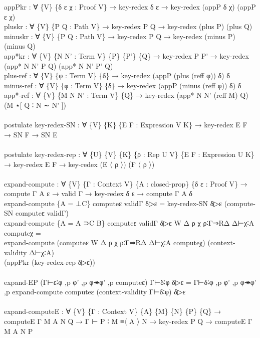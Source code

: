 {\begin{code}
{\>  appPkr : ∀ \{V\} \{δ ε χ : Proof V\} → key-redex δ ε → key-redex (appP δ χ) (appP ε χ)\<\\
\>  pluskr : ∀ \{V\} \{P Q : Path V\} → key-redex P Q → key-redex (plus P) (plus Q)\<\\
\>  minuskr : ∀ \{V\} \{P Q : Path V\} → key-redex P Q → key-redex (minus P) (minus Q)\<\\
\>  app*kr : ∀ \{V\} \{N N' : Term V\} \{P\} \{P'\} \{Q\} → key-redex P P' → key-redex (app* N N' P Q) (app* N N' P' Q)\<\\
\>  plus-ref : ∀ \{V\} \{φ : Term V\} \{δ\} → key-redex (appP (plus (reff φ)) δ) δ\<\\
\>  minus-ref : ∀ \{V\} \{φ : Term V\} \{δ\} → key-redex (appP (minus (reff φ)) δ) δ\<\\
\>  app*-ref : ∀ \{V\} \{M N N' : Term V\} \{Q\} → key-redex (app* N N' (reff M) Q) (M ⋆[ Q ∶ N ∼ N' ])\<\\
\>\<\\
\>postulate key-redex-SN : ∀ \{V\} \{K\} \{E F : Expression V K\} → key-redex E F → SN F → SN E\<\\
\>\<\\
\>postulate key-redex-rep : ∀ \{U\} \{V\} \{K\} \{ρ : Rep U V\} \{E F : Expression U K\} → key-redex E F → key-redex (E 〈 ρ 〉) (F 〈 ρ 〉)\<\\
\>\<\\
\>expand-compute : ∀ \{V\} \{Γ : Context V\} \{A : closed-prop\} \{δ ε : Proof V\} →\<\\
\>                compute Γ A ε → valid Γ → key-redex δ ε → compute Γ A δ\<\\
\>expand-compute \{A = ⊥C\} computeε validΓ δ▷ε = key-redex-SN δ▷ε (compute-SN computeε validΓ)\<\\
\>expand-compute \{A = A ⊃C B\} computeε validΓ δ▷ε W Δ ρ χ ρ∶Γ⇒RΔ Δ⊢χ∶A computeχ = \<\\
\>  expand-compute (computeε W Δ ρ χ ρ∶Γ⇒RΔ Δ⊢χ∶A computeχ) (context-validity Δ⊢χ∶A)\<\\
\>      (appPkr (key-redex-rep δ▷ε)) \<\\
\>\<\\
\>expand-EP (Γ⊢ε∶φ ,p φ' ,p φ↠φ' ,p computeε) Γ⊢δ∶φ δ▷ε = Γ⊢δ∶φ ,p φ' ,p φ↠φ' ,p expand-compute computeε (context-validity Γ⊢δ∶φ) δ▷ε\<\\
\>\<\\
\>expand-computeE : ∀ \{V\} \{Γ : Context V\} \{A\} \{M\} \{N\} \{P\} \{Q\} →\<\\
\>  computeE Γ M A N Q → Γ ⊢ P ∶ M ≡〈 A 〉 N → key-redex P Q → computeE Γ M A N P\<\\
}
\end{code}}
